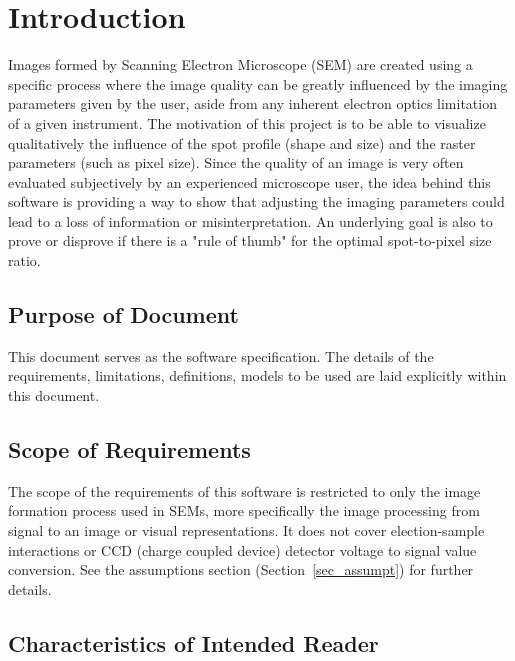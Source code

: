 \documentclass[12pt]{article}
\begin{document}
\newpage


\section{Introduction}

Images formed by Scanning Electron Microscope (SEM) are created using a 
specific process where the image quality can be greatly influenced by the 
imaging parameters given by the user, aside from any inherent electron 
optics limitation of a given instrument. The motivation of this project is 
to be able to visualize qualitatively the influence of the spot profile 
(shape and size) and the raster parameters (such as pixel size). Since the 
quality of an image is very often evaluated subjectively by an experienced 
microscope user, the idea behind this software is providing a way to show 
that adjusting the imaging parameters could lead to a loss of information 
or misinterpretation. An underlying goal is also to prove or disprove if 
there is a "rule of thumb" for the optimal spot-to-pixel size ratio.

\subsection{Purpose of Document}

This document serves as the software specification. The details of the 
requirements, limitations, definitions, models to be used are laid explicitly 
within this document.

\subsection{Scope of Requirements} 

The scope of the requirements of this software is restricted to only the image 
formation process used in SEMs, more specifically the image processing from 
signal to an image or visual representations. It does not cover election-sample 
interactions or CCD (charge coupled device) detector voltage to signal value 
conversion. See the assumptions section (Section~\ref{sec_assumpt}) for further 
details.

\subsection{Characteristics of Intended Reader} \label{sec_IntendedReader}
\end{document}
